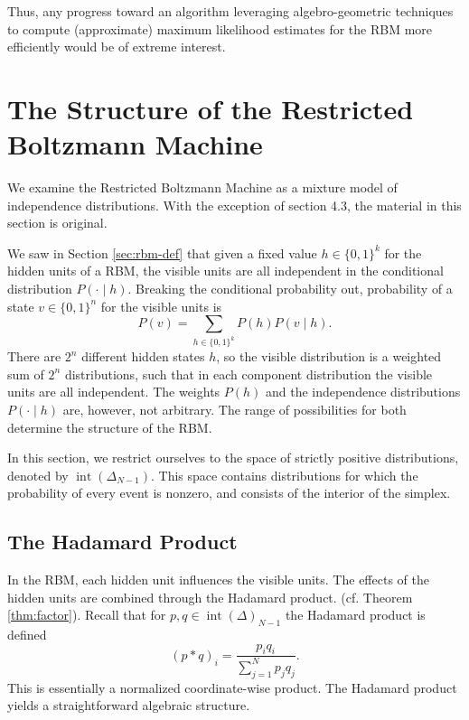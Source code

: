 \documentclass[cclicense]{hmcthesis}
\DeclareMathOperator{\intr}{int}
\numberwithin{equation}{section}
\begin{document}
    Thus, any progress toward an algorithm leveraging algebro-geometric
    techniques to compute (approximate) maximum likelihood estimates for the RBM
    more efficiently  would be of extreme interest.


\chapter{The Structure of the Restricted Boltzmann Machine}

    We examine the Restricted Boltzmann Machine as a mixture model of
    independence distributions.  With the exception of section 4.3, the
    material in this section is original.

    We saw in Section \ref{sec:rbm-def} that given a fixed value $h \in
    \{0,1\}^k$ for the hidden units of a RBM, the visible units are all
    independent in the conditional distribution $P( \cdot\mid h )$.  Breaking
    the conditional probability out, probability of a state $v \in \{0,1\}^n$
    for the visible units is
    \[
        P( v ) = \sum_{h \in \{0,1\}^k} P( h ) P( v \mid h ).
    \]
    There are $2^n$ different hidden states $h$, so the visible distribution is
    a weighted sum of $2^n$ distributions, such that in each component
    distribution the visible units are all independent.  The weights $P(h)$ and
    the independence distributions $P(\cdot \mid h)$ are, however, not
    arbitrary.  The range of possibilities for both determine the structure of
    the RBM.

    In this section, we restrict ourselves to the space of strictly positive
    distributions, denoted by $\intr(\Delta_{N-1})$.  This space contains
    distributions for which the probability of every event is nonzero, and
    consists of the interior of the simplex.

\section{The Hadamard Product}

    In the RBM, each hidden unit influences the visible units.  The effects of
    the hidden units are combined through the Hadamard product.  (cf. Theorem
    \ref{thm:factor}).  Recall that for $p, q \in \intr(\Delta)_{N-1}$ the
    Hadamard product is defined
    \[
        (p * q)_i = \frac{p_i q_i}{\sum_{j=1}^N p_j q_j}.
    \]
    This is essentially a normalized coordinate-wise product.  The Hadamard
    product yields a straightforward algebraic structure.
\end{document}
